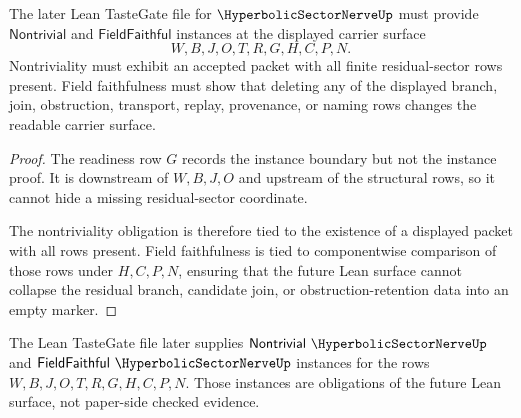 \begin{theorem}
\label{thm:hyperbolic-sector-nerve-tastegate-readiness}
The later Lean TasteGate file for $\HyperbolicSectorNerveUp$ must provide $\mathsf{Nontrivial}$ and $\mathsf{FieldFaithful}$ instances at the displayed carrier surface
$$
W,B,J,O,T,R,G,H,C,P,N.
$$
Nontriviality must exhibit an accepted packet with all finite residual-sector rows present. Field faithfulness must show that deleting any of the displayed branch, join, obstruction, transport, replay, provenance, or naming rows changes the readable carrier surface.
\end{theorem}
\begin{proof}
The readiness row $G$ records the instance boundary but not the instance proof. It is downstream of $W,B,J,O$ and upstream of the structural rows, so it cannot hide a missing residual-sector coordinate.

The nontriviality obligation is therefore tied to the existence of a displayed packet with all rows present. Field faithfulness is tied to componentwise comparison of those rows under $H,C,P,N$, ensuring that the future Lean surface cannot collapse the residual branch, candidate join, or obstruction-retention data into an empty marker.
\end{proof}



The Lean TasteGate file later supplies $\mathsf{Nontrivial}\ \HyperbolicSectorNerveUp$ and $\mathsf{FieldFaithful}\ \HyperbolicSectorNerveUp$ instances for the rows $W,B,J,O,T,R,G,H,C,P,N$. Those instances are obligations of the future Lean surface, not paper-side checked evidence.


